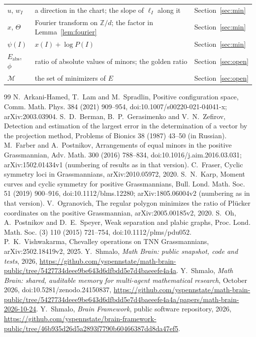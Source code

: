 \documentclass[11pt]{article}
\theoremstyle{remark}
\newcommand{\Z}{\mathbb{Z}}
\begin{document}
\begin{center}
\begin{tabular}{lp{8.6cm}l}
$u$, $w_I$ & a direction in the chart; the slope of $\ell_I$ along it & Section~\ref{sec:min}\\
$\hat x$, $\Theta$ & Fourier transform on $\Z/d$; the factor in Lemma~\ref{lem:fourier} & Section~\ref{sec:min}\\
$\psi(I)$ & $x(I)+\log P(I)$ & Section~\ref{sec:min}\\
$E_{\mathrm{abs}}$, $\phi$ & ratio of absolute values of minors; the golden ratio & Section~\ref{sec:open}\\
$\mathcal{M}$ & the set of minimizers of $E$ & Section~\ref{sec:open}\\
\bottomrule
\end{tabular}
\end{center}

\begin{thebibliography}{99}
 N.~Arkani-Hamed, T.~Lam and M.~Spradlin, Positive configuration space, Comm. Math. Phys. 384 (2021) 909--954, doi:10.1007/s00220-021-04041-x; arXiv:2003.03904.
 S.~D.~Berman, B.~P.~Gerasimenko and V.~N.~Zefirov, Detection and estimation of the largest error in the determination of a vector by the projection method, Problems of Bionics 38 (1987) 43--50 (in Russian).
 M.~Farber and A.~Postnikov, Arrangements of equal minors in the positive Grassmannian, Adv. Math. 300 (2016) 788--834, doi:10.1016/j.aim.2016.03.031; arXiv:1502.01434v1 (numbering of results as in that version).
 C.~Fraser, Cyclic symmetry loci in Grassmannians, arXiv:2010.05972, 2020.
 S.~N.~Karp, Moment curves and cyclic symmetry for positive Grassmannians, Bull. Lond. Math. Soc. 51 (2019) 900--916, doi:10.1112/blms.12280; arXiv:1805.06004v2 (numbering as in that version).
 V.~Ogranovich, The regular polygon minimizes the ratio of Pl\"ucker coordinates on the positive Grassmannian, arXiv:2005.00185v2, 2020.
 S.~Oh, A.~Postnikov and D.~E.~Speyer, Weak separation and plabic graphs, Proc. Lond. Math. Soc. (3) 110 (2015) 721--754, doi:10.1112/plms/pdu052.
 P.~K.~Vishwakarma, Chevalley operations on TNN Grassmannians, arXiv:2502.18419v2, 2025.
 Y.~Shmalo, \emph{Math Brain: public snapshot, code and tests}, 2026, \url{https://github.com/yspennstate/math-brain-public/tree/5427734deee9be643d6dfbdd5e7d4baeeefe4a4a}.
 Y.~Shmalo, \emph{Math Brain: shared, auditable memory for multi-agent mathematical research}, October 2026, doi:10.5281/zenodo.24150837, \url{https://github.com/yspennstate/math-brain-public/tree/5427734deee9be643d6dfbdd5e7d4baeeefe4a4a/papers/math-brain-2026-10-24}.
 Y.~Shmalo, \emph{Brain Framework}, public software repository, 2026, \url{https://github.com/yspennstate/brain-framework-public/tree/46b935d26d5a2893f7790b60466387dd8da47ef5}.
\end{thebibliography}
\end{document}
